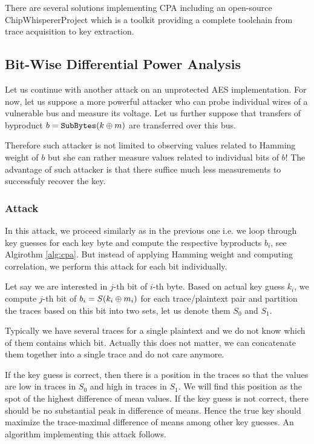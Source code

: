 There are several solutions implementing CPA including an open-source ChipWhisperer\texttrademark Project \cite{chipwhisperer} which is a toolkit providing a complete toolchain from trace acquisition to key extraction.

\subsection{Bit-Wise Differential Power Analysis}

Let us continue with another attack on an unprotected AES implementation. For now, let us suppose a more powerful attacker who can probe individual wires of a vulnerable bus and measure its voltage. Let us further suppose that transfers of byproduct $b = \texttt{SubBytes}(k\oplus m)$ are transferred over this bus.

Therefore such attacker is not limited to observing values related to Hamming weight of $b$ but she can rather measure values related to individual bits of $b$! The advantage of such attacker is that there suffice much less measurements to successfuly recover the key.

\subsubsection{Attack}

In this attack, we proceed similarly as in the previous one i.e. we loop through key guesses for each key byte and compute the respective byproducts $b_i$, see Algirothm \ref{alg:cpa}. But instead of applying Hamming weight and computing correlation, we perform this attack for each bit individually.

Let say we are interested in $j$-th bit of $i$-th byte. Based on actual key guess $k_i$, we compute $j$-th bit of $b_i = S(k_i\oplus m_i)$ for each trace/plaintext pair and partition the traces based on this bit into two sets, let us denote them $S_0$ and $S_1$.

\begin{note}
	Typically we have several traces for a single plaintext and we do not know which of them contains which bit. Actually this does not matter, we can concatenate them together into a single trace and do not care anymore.
\end{note}

If the key guess is correct, then there is a position in the traces so that the values are low in traces in $S_0$ and high in traces in $S_1$. We will find this position as the spot of the highest difference of mean values. If the key guess is not correct, there should be no substantial peak in difference of means. Hence the true key should maximize the trace-maximal difference of means among other key guesses. An algorithm implementing this attack follows.

